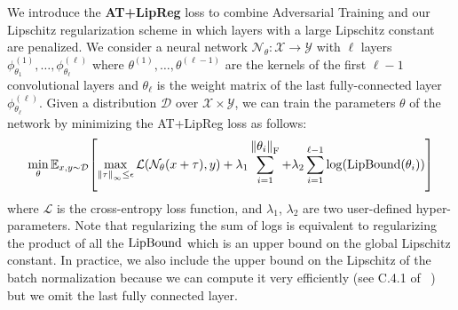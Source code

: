 We introduce the \textbf{AT+LipReg} loss to combine Adversarial Training and our Lipschitz regularization scheme in which layers with a large Lipschitz constant are penalized.
We consider a neural network $\mathcal N_\theta : \mathcal X \rightarrow \mathcal Y$ with $\ell$ layers $\phi^{(1)}_{\theta_1}, \ldots, \phi^{(\ell)}_{\theta_\ell}$ where $\theta^{(1)}, \ldots, \theta^{(\ell -1)}$ are the kernels of the first $\ell - 1$ convolutional layers and $\theta_\ell$ is the weight matrix of the last fully-connected  layer $\phi^{(\ell)}_{\theta_\ell}$.
Given a distribution $\mathcal D$ over $\mathcal X \times \mathcal Y$, we can train the parameters $\theta$ of the network by minimizing the AT+LipReg loss as follows:
\begin{equation} \label{eqn:obj_function}
    \min_{\theta} \mathbb E_{x,y \sim \mathcal D} \left[ \max_{\norm{\tau}_\infty \leq \epsilon} \mathcal{L}(\mathcal{N}_\theta(x + \tau), y)  + \lambda_1 \sum_{i=1}^ {\textstyle \norm{\theta_i}_\text{F}} + \lambda_2 \sum_{i=1}^{\ell-1} \log\left( \lipbound\left(\theta_i\right)\right) \right]
\end{equation}
where $\mathcal L$ is the cross-entropy loss function, and $\lambda_1$, $\lambda_2$ are two user-defined hyper-parameters.
Note that regularizing the sum of logs is equivalent to regularizing the product of all the $\operatorname{LipBound}$ which is an upper bound on the global Lipschitz constant.
In practice, we also include the upper bound on the Lipschitz of the batch normalization because we can compute it very efficiently (see C.4.1 of ~\cite{tsuzuku2018lipschitz}) but we omit the last fully connected layer. 


